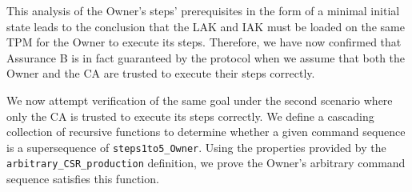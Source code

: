 \documentclass[runningheads]{llncs}
\begin{document}



This analysis of the Owner's steps' prerequisites in the form of a
minimal initial state leads to the conclusion that the LAK and IAK
must be loaded on the same TPM for the Owner to execute its
steps. 
Therefore, we have now confirmed that Assurance B is in fact guaranteed by the
protocol when we assume that both the Owner and the CA are trusted to
execute their steps correctly.


We now attempt verification of the same goal under the second scenario
where only the CA is trusted to execute its steps correctly. 
We define a cascading collection of recursive functions to determine
whether a given command sequence is a supersequence of
\verb|steps1to5_Owner|.  Using the properties provided by the
\verb|arbitrary_CSR_production| definition, we prove the Owner's
arbitrary command sequence satisfies this function.

\end{document}
